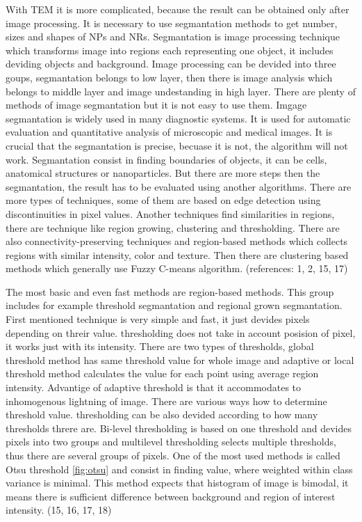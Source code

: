 \documentclass[a4paper,12pt]{article}   %
\numberwithin{equation}{section}        %
\begin{document}
        With TEM it is more complicated, because the result can be obtained only after image processing. It is necessary to use segmantation methods to get number, sizes and shapes of
        NPs and NRs. Segmantation is image processing technique which transforms image into regions each representing one object, it includes deviding objects and background.
        Image processing can be devided into three goups, segmantation belongs to low layer, then there is image analysis which belongs to middle layer and image undestanding in high layer.
        There are plenty of methods of image segmantation but it is not easy to use them. Imgage segmantation is widely used in many diagnostic systems.
        It is used for automatic evaluation and quantitative analysis of microscopic and medical images. It is crucial that the segmantation is precise, becuase it is not,
        the algorithm will not work. Segmantation consist in finding boundaries of objects, it can be cells, anatomical structures or nanoparticles.
        But there are more steps then the segmantation, the result has to be evaluated using another algorithms. There are more types of techniques, some of them are based on
        edge detection using discontinuities in pixel values. Another techniques find similarities in regions, there are technique like region growing, clustering and thresholding.
        There are also connectivity-preserving techniques and region-based methods which collects regions with similar intensity, color and texture.
        Then there are clustering based methods which generally use Fuzzy C-means algorithm.
        (references: 1, 2, 15, 17)

        The most basic and even fast methods are region-based methods. This group includes for example threshold segmantation and regional grown segmantation.
        First mentioned technique is very simple and fast, it just devides pixels depending on threir value. thresholding does not  take in account posision of pixel,
        it works just with its intensity. There are two types of thresholds, global threshold method has same threshold value for whole image and adaptive or local
        threshold method calculates the value for each point using average region intensity. Advantige of adaptive threshold is that it accommodates to inhomogenous
        lightning of image. There are various ways how to determine threshold value. thresholding can be also devided according to how many thresholds threre are.
        Bi-level thresholding is based on one threshold and devides pixels into two groups and multilevel thresholding selects multiple thresholds, thus there are several groups of pixels.
        One of the most used methods is called Otsu threshold \ref{fig:otsu} and consist in finding value, where weighted within class variance is minimal. This method expects that histogram of image
        is bimodal, it means there is sufficient difference between background and region of interest intensity.  (15, 16, 17, 18)
        
\end{document}
